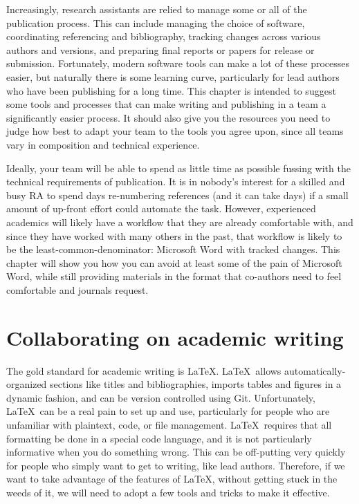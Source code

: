
\begin{fullwidth}
Increasingly, research assistants are relied to manage some or all
of the publication process. This can include
managing the choice of software,
coordinating referencing and bibliography,
tracking changes across various authors and versions,
and preparing final reports or papers for release or submission.
Fortunately, modern software tools can make a lot of these processes easier,
but naturally there is some learning curve,
particularly for lead authors who have been publishing for a long time.
This chapter is intended to suggest some tools and processes
that can make writing and publishing in a team
a significantly easier process.
It should also give you the resources you need
to judge how best to adapt your team to the tools you agree upon,
since all teams vary in composition and technical experience.

Ideally, your team will be able to spend as little time as possible
fussing with the technical requirements of publication.
It is in nobody's interest for a skilled and busy RA
to spend days re-numbering references (and it can take days)
if a small amount of up-front effort could automate the task.
However, experienced academics will likely have a workflow
that they are already comfortable with,
and since they have worked with many others in the past,
that workflow is likely to be the least-common-denominator:
Microsoft Word with tracked changes.
This chapter will show you how you can avoid at least some
of the pain of Microsoft Word,
while still providing materials in the format
that co-authors need to feel comfortable and journals request.
\end{fullwidth}


\section{Collaborating on academic writing}

The gold standard for academic writing is \LaTeX.
\LaTeX\ allows automatically-organized sections like titles and bibliographies,
imports tables and figures in a dynamic fashion,
and can be version controlled using Git.
Unfortunately, \LaTeX\ can be a real pain to set up and use,
particularly for people who are unfamiliar with plaintext, code, or file management.
\LaTeX\ requires that all formatting be done in a special code language,
and it is not particularly informative when you do something wrong.
This can be off-putting very quickly for people
who simply want to get to writing, like lead authors.
Therefore, if we want to take advantage of the features of \LaTeX,
without getting stuck in the weeds of it,
we will need to adopt a few tools and tricks to make it effective.

